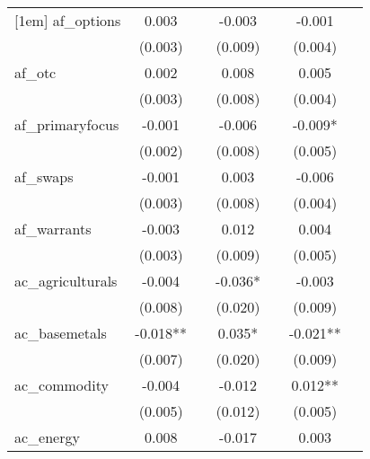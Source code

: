 {\begin{tabular}{l*{6}{c}}
[1em]
af\_options  &       0.003   &               &      -0.003   &               &      -0.001   &               \\
            &     (0.003)   &               &     (0.009)   &               &     (0.004)   &               \\
[1em]
af\_otc      &       0.002   &               &       0.008   &               &       0.005   &               \\
            &     (0.003)   &               &     (0.008)   &               &     (0.004)   &               \\
[1em]
af\_primaryfocus&      -0.001   &               &      -0.006   &               &      -0.009*  &               \\
            &     (0.002)   &               &     (0.008)   &               &     (0.005)   &               \\
[1em]
af\_swaps    &      -0.001   &               &       0.003   &               &      -0.006   &               \\
            &     (0.003)   &               &     (0.008)   &               &     (0.004)   &               \\
[1em]
af\_warrants &      -0.003   &               &       0.012   &               &       0.004   &               \\
            &     (0.003)   &               &     (0.009)   &               &     (0.005)   &               \\
[1em]
ac\_agriculturals&      -0.004   &               &      -0.036*  &               &      -0.003   &               \\
            &     (0.008)   &               &     (0.020)   &               &     (0.009)   &               \\
[1em]
ac\_basemetals&      -0.018** &               &       0.035*  &               &      -0.021** &               \\
            &     (0.007)   &               &     (0.020)   &               &     (0.009)   &               \\
[1em]
ac\_commodity&      -0.004   &               &      -0.012   &               &       0.012** &               \\
            &     (0.005)   &               &     (0.012)   &               &     (0.005)   &               \\
[1em]
ac\_energy   &       0.008   &               &      -0.017   &               &       0.003   &               \\

\end{tabular}}
